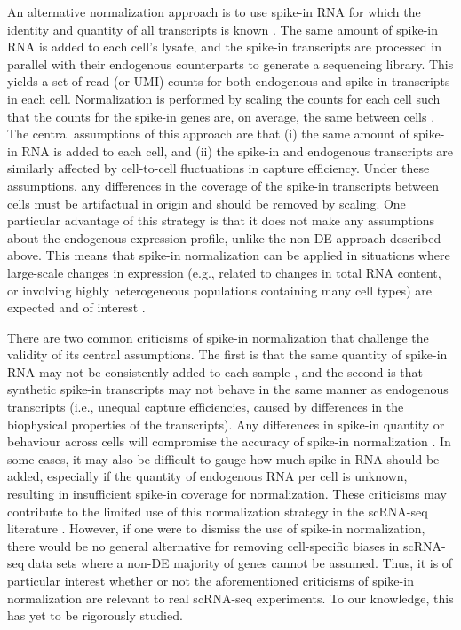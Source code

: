 \documentclass{article}
\begin{document}
An alternative normalization approach is to use spike-in RNA for which the identity and quantity of all transcripts is known \autocite{stegle2015computational,bacher2016design}.
The same amount of spike-in RNA is added to each cell's lysate, and the spike-in transcripts are processed in parallel with their endogenous counterparts to generate a sequencing library.
This yields a set of read (or UMI) counts for both endogenous and spike-in transcripts in each cell.
Normalization is performed by scaling the counts for each cell such that the counts for the spike-in genes are, on average, the same between cells \autocite{katayama2013samstrt}.
The central assumptions of this approach are that (i) the same amount of spike-in RNA is added to each cell, and (ii) the spike-in and endogenous transcripts are similarly affected by cell-to-cell fluctuations in capture efficiency.
Under these assumptions, any differences in the coverage of the spike-in transcripts between cells must be artifactual in origin and should be removed by scaling.
One particular advantage of this strategy is that it does not make any assumptions about the endogenous expression profile, unlike the non-DE approach described above.
This means that spike-in normalization can be applied in situations where large-scale changes in expression (e.g., related to changes in total RNA content, or involving highly heterogeneous populations containing many cell types) are expected and of interest \autocite{lun2016stepbystep,nestorowa2016single}.

There are two common criticisms of spike-in normalization that challenge the validity of its central assumptions.
The first is that the same quantity of spike-in RNA may not be consistently added to each sample \autocite{robinson2010tmm}, and the second is that synthetic spike-in transcripts may not behave in the same manner as endogenous transcripts \autocite{grun2015design} (i.e., unequal capture efficiencies, caused by differences in the biophysical properties of the transcripts).
Any differences in spike-in quantity or behaviour across cells will compromise the accuracy of spike-in normalization \autocite{risso2014normalization}.
In some cases, it may also be difficult to gauge how much spike-in RNA should be added, especially if the quantity of endogenous RNA per cell is unknown, resulting in insufficient spike-in coverage for normalization.
These criticisms may contribute to the limited use of this normalization strategy in the scRNA-seq literature \autocite{bacher2016design}.
However, if one were to dismiss the use of spike-in normalization, there would be no general alternative for removing cell-specific biases in scRNA-seq data sets where a non-DE majority of genes cannot be assumed.
Thus, it is of particular interest whether or not the aforementioned criticisms of spike-in normalization are relevant to real scRNA-seq experiments.
To our knowledge, this has yet to be rigorously studied.
\end{document}
